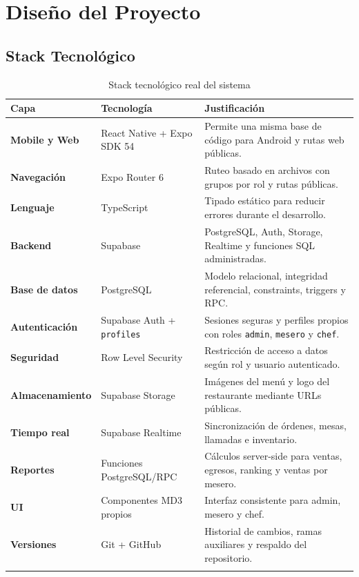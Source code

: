 \chapter{Diseño del Proyecto}

\section{Stack Tecnológico}

\begin{longtable}{>{\bfseries}p{3cm} p{4cm} p{5.5cm}}
  \toprule
  \textbf{Capa} & \textbf{Tecnología} & \textbf{Justificación} \\
  \midrule
  \endhead
  Mobile y Web & React Native + Expo SDK 54 & Permite una misma base de código para Android y rutas web públicas. \\[3pt]
  Navegación & Expo Router 6 & Ruteo basado en archivos con grupos por rol y rutas públicas. \\[3pt]
  Lenguaje & TypeScript & Tipado estático para reducir errores durante el desarrollo. \\[3pt]
  Backend & Supabase & PostgreSQL, Auth, Storage, Realtime y funciones SQL administradas. \\[3pt]
  Base de datos & PostgreSQL & Modelo relacional, integridad referencial, constraints, triggers y RPC. \\[3pt]
  Autenticación & Supabase Auth + \texttt{profiles} & Sesiones seguras y perfiles propios con roles \texttt{admin}, \texttt{mesero} y \texttt{chef}. \\[3pt]
  Seguridad & Row Level Security & Restricción de acceso a datos según rol y usuario autenticado. \\[3pt]
  Almacenamiento & Supabase Storage & Imágenes del menú y logo del restaurante mediante URLs públicas. \\[3pt]
  Tiempo real & Supabase Realtime & Sincronización de órdenes, mesas, llamadas e inventario. \\[3pt]
  Reportes & Funciones PostgreSQL/RPC & Cálculos server-side para ventas, egresos, ranking y ventas por mesero. \\[3pt]
  UI & Componentes MD3 propios & Interfaz consistente para admin, mesero y chef. \\[3pt]
  Versiones & Git + GitHub & Historial de cambios, ramas auxiliares y respaldo del repositorio. \\
  \bottomrule
  \caption{Stack tecnológico real del sistema}
\end{longtable}

